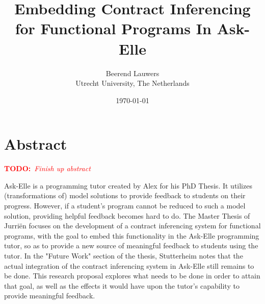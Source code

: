 \documentclass[10pt]{report}
\author{
	Beerend Lauwers\\
	Utrecht University, The Netherlands}
\date{\today}
\title{Embedding Contract Inferencing for Functional Programs In Ask-Elle}
\newcommand{\annotate}[3]{
	\begin{scriptsize}
	\textcolor{#1}{\textbf{#2}~\textit{#3}}
	\end{scriptsize}\newline}
\newcommand{\todo}[1]{\annotate{red} {TODO:} {#1}}
\begin{document}
\maketitle


\chapter{Abstract}
\todo{Finish up abstract}
Ask-Elle is a programming tutor created by Alex \citet{Gerdes:2012:phd} for his PhD Thesis. It utilizes (transformations of) model solutions to provide feedback to students on their progress.
However, if a student's program cannot be reduced to such a model solution, providing helpful feedback becomes hard to do. 
The Master Thesis of Jurri\"en \citet{Stutterheim:2013:thesis} focuses on the development of a contract inferencing system for functional programs, with the goal to embed this functionality in the Ask-Elle programming tutor, so as to provide a new source of meaningful feedback to students using the tutor.
In the "Future Work" section of the thesis, Stutterheim notes that the actual integration of the contract inferencing system in Ask-Elle still remains to be done.
This research proposal explores what needs to be done in order to attain that goal, as well as the effects it would have upon the tutor's capability to provide meaningful feedback.
\end{document}
